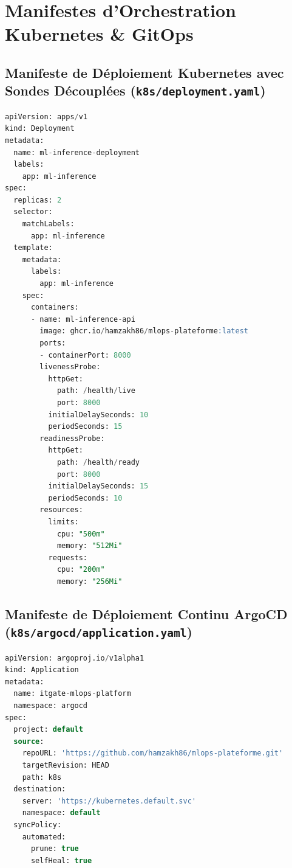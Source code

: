 \documentclass[11pt,a4paper,oneside]{report}
\begin{document}
\newpage

\appendix

\chapter{Manifestes d'Orchestration Kubernetes \& GitOps}

\section[Manifeste Déploiement Kubernetes]{Manifeste de Déploiement Kubernetes avec Sondes Découplées (\texttt{k8s/deployment.yaml})}
\begin{lstlisting}[language=SQL, caption={Extrait du manifeste Deployment Kubernetes avec sondes liveness et readiness}]
apiVersion: apps/v1
kind: Deployment
metadata:
  name: ml-inference-deployment
  labels:
    app: ml-inference
spec:
  replicas: 2
  selector:
    matchLabels:
      app: ml-inference
  template:
    metadata:
      labels:
        app: ml-inference
    spec:
      containers:
      - name: ml-inference-api
        image: ghcr.io/hamzakh86/mlops-plateforme:latest
        ports:
        - containerPort: 8000
        livenessProbe:
          httpGet:
            path: /health/live
            port: 8000
          initialDelaySeconds: 10
          periodSeconds: 15
        readinessProbe:
          httpGet:
            path: /health/ready
            port: 8000
          initialDelaySeconds: 15
          periodSeconds: 10
        resources:
          limits:
            cpu: "500m"
            memory: "512Mi"
          requests:
            cpu: "200m"
            memory: "256Mi"
\end{lstlisting}

\section[Manifeste ArgoCD GitOps]{Manifeste de Déploiement Continu ArgoCD (\texttt{k8s/argocd/application.yaml})}
\begin{lstlisting}[language=SQL, caption={Manifeste de l'Application ArgoCD pour la synchronisation continue GitOps}]
apiVersion: argoproj.io/v1alpha1
kind: Application
metadata:
  name: itgate-mlops-platform
  namespace: argocd
spec:
  project: default
  source:
    repoURL: 'https://github.com/hamzakh86/mlops-plateforme.git'
    targetRevision: HEAD
    path: k8s
  destination:
    server: 'https://kubernetes.default.svc'
    namespace: default
  syncPolicy:
    automated:
      prune: true
      selfHeal: true
\end{lstlisting}
\end{document}
